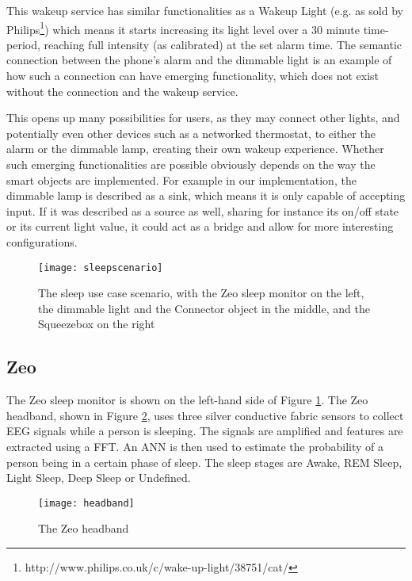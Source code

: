 This wakeup service has similar functionalities as a Wakeup Light (e.g. as sold by Philips\footnote{http://www.philips.co.uk/c/wake-up-light/38751/cat/}) which means it starts increasing its light level over a 30 minute time-period, reaching full intensity (as calibrated) at the set alarm time. The semantic connection between the phone's alarm and the dimmable light is an example of how such a connection can have emerging functionality, which does not exist without the connection and the wakeup service.  

This opens up many possibilities for users, as they may connect other lights, and potentially even other devices such as a networked thermostat, to either the alarm or the dimmable lamp, creating their own wakeup experience. Whether such emerging functionalities are possible obviously depends on the way the smart objects are implemented. For example in our implementation, the dimmable lamp is described as a sink, which means it is only capable of accepting input. If it was described as a source as well, sharing for instance its on/off state or its current light value, it could act as a bridge and allow for more interesting configurations. %

\begin{figure}
\centering
\texttt{[image: sleepscenario]}
\caption{The sleep use case scenario, with the Zeo sleep monitor on the left, the dimmable light and the Connector object in the middle, and the Squeezebox on the right}
\label{sleepusecase}
\end{figure}

\subsection{Zeo}

The Zeo sleep monitor is shown on the left-hand side of Figure \ref{sleepusecase}. The Zeo headband, shown in Figure \ref{headband}, uses three silver conductive fabric sensors to collect \ac{EEG} signals while a person is sleeping. The signals are amplified and features are extracted using a \ac{FFT}. An \ac{ANN} is then used to estimate the probability of a person being in a certain phase of sleep\cite{Rubin2009}. The sleep stages are Awake, \ac{REM} Sleep, Light Sleep, Deep Sleep or Undefined. 

\begin{figure}
\centering
\texttt{[image: headband]}
\caption{The Zeo headband}
\label{headband}
\end{figure}


